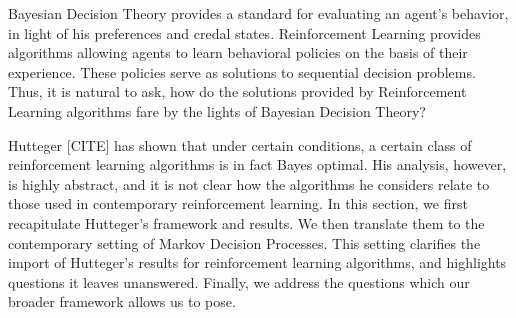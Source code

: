 Bayesian Decision Theory provides a standard for evaluating an agent's behavior, in light of his preferences and credal states.
Reinforcement Learning provides algorithms allowing agents to learn behavioral policies on the basis of their experience.
These policies serve as solutions to sequential decision problems.
Thus, it is natural to ask, how do the solutions provided by Reinforcement Learning algorithms fare by the lights of Bayesian Decision Theory?

Hutteger [CITE] has shown that under certain conditions, a certain class of reinforcement learning algorithms is in fact Bayes optimal.
His analysis, however, is highly abstract, and it is not clear how the algorithms he considers relate to those used in contemporary reinforcement learning.
In this section, we first recapitulate Hutteger's framework and results.
We then translate them to the contemporary setting of Markov Decision Processes.
This setting clarifies the import of Hutteger's results for reinforcement learning algorithms, and highlights questions it leaves unanswered.
Finally, we address the questions which our broader framework allows us to pose.
